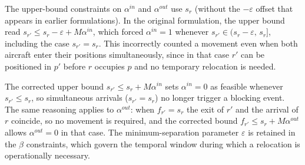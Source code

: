 


\begin{remark}
The upper-bound constraints on $\alpha^{in}$ and $\alpha^{out}$ use $s_r$ (without the $-\varepsilon$ offset that appears in earlier formulations).
In the original formulation, the upper bound read $s_{r'} \le s_r - \varepsilon + M\alpha^{in}$, which forced $\alpha^{in}=1$ whenever $s_{r'} \in (s_r-\varepsilon,\, s_r]$, including the case $s_{r'} = s_r$.
This incorrectly counted a movement even when both aircraft enter their positions simultaneously, since in that case $r'$ can be positioned in $p'$ before $r$ occupies $p$ and no temporary relocation is needed.

The corrected upper bound $s_{r'} \le s_r + M\alpha^{in}$ sets $\alpha^{in}=0$ as feasible whenever $s_{r'} \le s_r$, so simultaneous arrivals ($s_{r'} = s_r$) no longer trigger a blocking event.
The same reasoning applies to $\alpha^{out}$: when $f_{r'} = s_r$ the exit of $r'$ and the arrival of $r$ coincide, so no movement is required, and the corrected bound $f_{r'} \le s_r + M\alpha^{out}$ allows $\alpha^{out}=0$ in that case.
The minimum-separation parameter $\varepsilon$ is retained in the $\beta$ constraints, which govern the temporal window during which a relocation is operationally necessary.
\end{remark}

